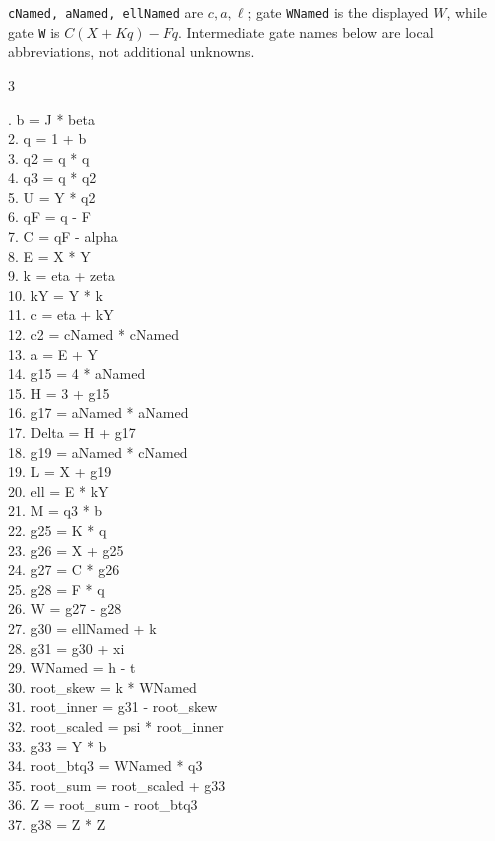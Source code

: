 \documentclass[10pt]{article}
\begin{document}
\texttt{cNamed, aNamed, ellNamed} are $c,a,\ell$; gate \texttt{WNamed} is the
displayed $W$, while gate \texttt{W} is $C(X+Kq)-Fq$. Intermediate gate
names below are local abbreviations, not additional unknowns.
\begin{multicols}{3}
\raggedright\ttfamily\fontsize{7.2}{8.4}. b = J * beta\\
2. q = 1 + b\\
3. q2 = q * q\\
4. q3 = q * q2\\
5. U = Y * q2\\
6. qF = q - F\\
7. C = qF - alpha\\
8. E = X * Y\\
9. k = eta + zeta\\
10. kY = Y * k\\
11. c = eta + kY\\
12. c2 = cNamed * cNamed\\
13. a = E + Y\\
14. g15 = 4 * aNamed\\
15. H = 3 + g15\\
16. g17 = aNamed * aNamed\\
17. Delta = H + g17\\
18. g19 = aNamed * cNamed\\
19. L = X + g19\\
20. ell = E * kY\\
21. M = q3 * b\\
22. g25 = K * q\\
23. g26 = X + g25\\
24. g27 = C * g26\\
25. g28 = F * q\\
26. W = g27 - g28\\
27. g30 = ellNamed + k\\
28. g31 = g30 + xi\\
29. WNamed = h - t\\
30. root\_skew = k * WNamed\\
31. root\_inner = g31 - root\_skew\\
32. root\_scaled = psi * root\_inner\\
33. g33 = Y * b\\
34. root\_btq3 = WNamed * q3\\
35. root\_sum = root\_scaled + g33\\
36. Z = root\_sum - root\_btq3\\
37. g38 = Z * Z\\

\end{multicols}
\end{document}
